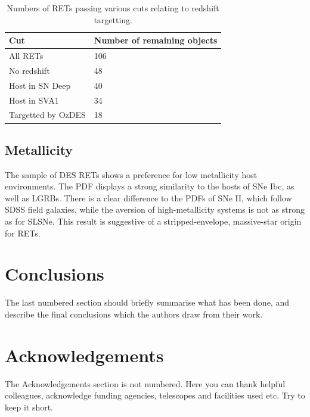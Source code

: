 \documentclass[fleqn,usenatbib,]{mnras}
\begin{document}
\begin{table}
    \centering
    \begin{tabular}{l|l}
         Cut &  Number of remaining objects \\
        \toprule
        All RETs & 106 \\
        No redshift   & 48\\
        Host in SN Deep & 40\\
        Host in SVA1 & 34 \\
        Targetted by OzDES & 18 \\
        \bottomrule
    \end{tabular}
    \caption{Numbers of RETs passing various cuts relating to redshift targetting.}
    \label{tab:z_cuts}
\end{table}

\subsection{Metallicity}

The sample of DES RETs shows a preference for low metallicity host environments. The PDF displays a strong similarity to the hosts of SNe Ibc, as well as LGRBs. There is a clear difference to the PDFs of SNe II, which follow SDSS field galaxies, while the aversion of high-metallicity systems is not as strong as for SLSNe. This result is suggestive of a stripped-envelope, massive-star origin for RETs. 





\section{Conclusions}

The last numbered section should briefly summarise what has been done, and describe
the final conclusions which the authors draw from their work.

\section*{Acknowledgements}

The Acknowledgements section is not numbered. Here you can thank helpful
colleagues, acknowledge funding agencies, telescopes and facilities used etc.
Try to keep it short.


\end{document}
